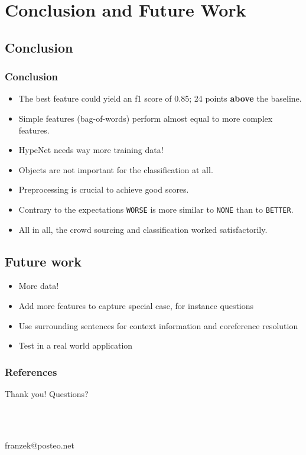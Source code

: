 \documentclass[11pt,aspectratio=169,usenames,dvipsnames]{beamer}
\begin{document}
    \section{Conclusion and Future Work}
    \frame{\sectionpage}
    \subsection{Conclusion}
    \begin{frame}[t]
        \frametitle{Conclusion}
        \begin{itemize}
        \item The best feature could yield an f1 score of 0.85; 24 points \textbf{above} the baseline.
        \item Simple features (bag-of-words) perform almost equal to more complex features.
        \item HypeNet needs way more training data!\pause
        \item Objects are not important for the classification at all.
        \item Preprocessing is crucial to achieve good scores.\pause
        \item Contrary to the expectations \texttt{WORSE} is more similar to \texttt{NONE} than to \texttt{BETTER}.
        \item All in all, the crowd sourcing and classification worked satisfactorily.
        \end{itemize}
    \end{frame}
      \subsection{Future work}
    \begin{frame}
        \begin{itemize}
        \frametitle{Future work}
    \item More data!
    \item Add more features to capture special case, for instance questions
    \item Use surrounding sentences for context information and coreference resolution
    \item Test in a real world application
    \end{itemize}
    \end{frame}



    \begin{frame}[allowframebreaks]
        \frametitle{References}
        
        
    \end{frame}
    
    \begin{frame}
    \begin{center}
    \begin{LARGE} Thank you! Questions? \end{LARGE}\\\par
    \hfill \\
    franzek@posteo.net
    \end{center}

    \end{frame}
\end{document}
